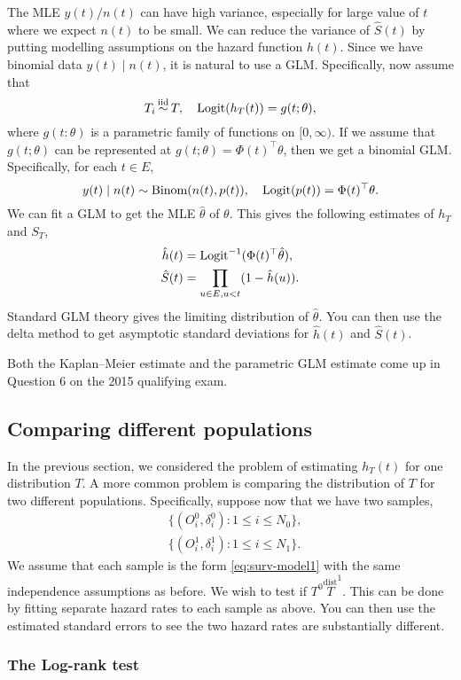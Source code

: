 The MLE $y(t)/n(t)$ can have high variance, especially for large value of $t$ where we expect $n(t)$ to be small. We can reduce the variance of $\hat{S}(t)$ by putting modelling assumptions on the hazard function $h(t)$. Since we have binomial data $y(t)\mid n(t)$, it is natural to use a GLM. Specifically, now assume that
\[
    T_i \simiid T, \quad \logit( h_T(t)) = g(t;\theta),
\] 
where $g(t:\theta)$ is a parametric family of functions on $[0,\infty)$. If we assume that $g(t;\theta)$ can be represented at $g(t;\theta) = \Phi(t)^\top \theta$, then we get a binomial GLM. Specifically, for each $t \in E$,
\[ 
    y(t) \mid n(t) \sim \mathrm{Binom}(n(t), p(t)), \quad \mathrm{Logit}(p(t)) = \Phi(t)^\top \theta.    
\]
We can fit a GLM to get the MLE $\hat{\theta}$ of $\theta$. This gives the following estimates of $h_T$ and $S_T$,
\begin{align*}
    \hat{h}(t)&=\mathrm{Logit}^{-1}(\Phi(t)^\top \hat{\theta}),\\
    \hat{S}(t)&=\prod_{u \in E, u < t}(1-\hat{h}(u)).
\end{align*}
Standard GLM theory gives the limiting distribution of $\hat{\theta}$. You can then use the delta method to get asymptotic standard deviations for $\hat{h}(t)$ and $\hat{S}(t)$. 

Both the Kaplan--Meier estimate and the parametric GLM estimate come up in Question 6 on the 2015 qualifying exam.

\subsection{Comparing different populations}

In the previous section, we considered the problem of estimating $h_T(t)$ for one distribution $T$. A more common problem is comparing the distribution of $T$ for two different populations. Specifically, suppose now that we have two samples,
\begin{align*}
    &\{(O_i^0,\delta_i^0):1 \le i \le N_0\},\\
    &\{(O_i^1,\delta_i^1) : 1 \le i \le N_1\}.
\end{align*}
We assume that each sample is the form \eqref{eq:surv-model1} with the same independence assumptions as before. We wish to test if $T^0 \stackrel{\text{dist}} T^1$. This can be done by fitting separate hazard rates to each sample as above. You can then use the estimated standard errors to see the two hazard rates are substantially different.

\subsubsection*{The Log-rank test}

